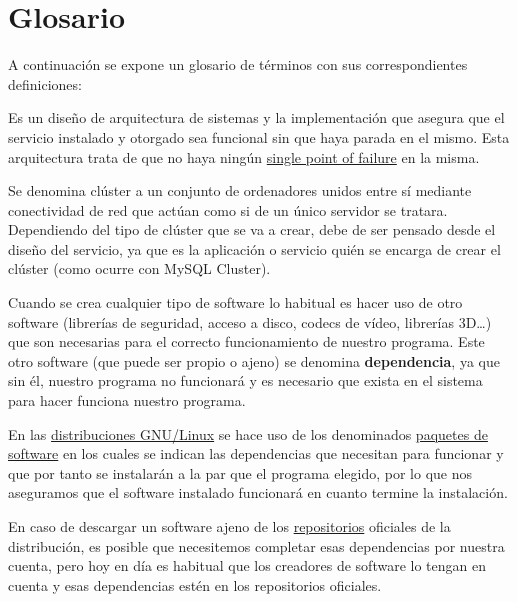 \chapter{Glosario}

A continuación se expone un glosario de términos con sus correspondientes definiciones:

\begin{description}
    \hypertarget{altadisponibilidad}{}
    \item[Alta Disponibilidad:] Es un diseño de arquitectura de sistemas y la implementación que asegura que el servicio instalado y otorgado sea funcional sin que haya parada en el mismo. Esta arquitectura trata de que no haya ningún \hyperlink{spf}{single point of failure} en la misma.

    \hypertarget{cluster}{}
    \item[Clúster:] Se denomina clúster a un conjunto de ordenadores unidos entre sí mediante conectividad de red que actúan como si de un único servidor se tratara. Dependiendo del tipo de clúster que se va a crear, debe de ser pensado desde el diseño del servicio, ya que es la aplicación o servicio quién se encarga de crear el clúster (como ocurre con MySQL Cluster).

    \hypertarget{dependencia_software}{}
    \item [Dependencia de software:] Cuando se crea cualquier tipo de software lo habitual es hacer uso de otro software (librerías de seguridad, acceso a disco, codecs de vídeo, librerías 3D…) que son necesarias para el correcto funcionamiento de nuestro programa. Este otro software (que puede ser propio o ajeno) se denomina \textbf{dependencia}, ya que sin él, nuestro programa no funcionará y es necesario que exista en el sistema para hacer funciona nuestro programa.

    En las \hyperlink{distribucion_gnu_linux}{distribuciones GNU/Linux} se hace uso de los denominados \hyperlink{paquete_de_software}{paquetes de software} en los cuales se indican las dependencias que necesitan para funcionar y que por tanto se instalarán a la par que el programa elegido, por lo que nos aseguramos que el software instalado funcionará en cuanto termine la instalación.

    En caso de descargar un software ajeno de los \hyperlink{repositorio_de_software}{repositorios} oficiales de la distribución, es posible que necesitemos completar esas dependencias por nuestra cuenta, pero hoy en día es habitual que los creadores de software lo tengan en cuenta y esas dependencias estén en los repositorios oficiales.


\end{description}
